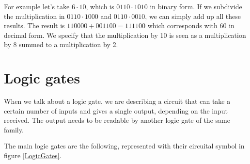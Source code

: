 \documentclass{article}
\begin{document}
\vspace{3mm}

For example let's take $6 \cdot 10$, which is $0110 \cdot 1010$ in binary form. If we subdivide the multiplication in $0110 \cdot 1000$ and $0110 \cdot 0010$, we can simply add up all these results. The result is $110000 + 001100 = 111100$ which corresponds with 60 in decimal form. We specify that the multiplication by 10 is seen as a multiplication by 8 summed to a multiplication by 2.












\section{Logic gates}

When we talk about a logic gate, we are describing a circuit that can take a certain number of inputs and gives a single output, depending on the input received. The output needs to be readable by another logic gate of the same family.

\vspace{3mm}

The main logic gates are the following, represented with their circuital symbol in figure \ref{LogicGates}.
\end{document}
